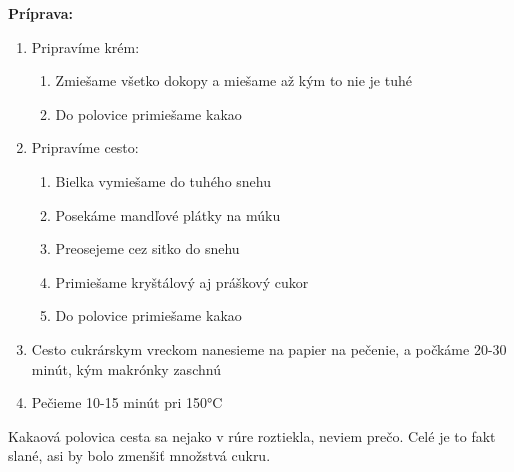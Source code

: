 \begin{recipe}
\textbf{ {\normalsize Príprava:} }
\begin{enumerate}

  \item{Pripravíme krém: }
      \begin{enumerate}
          \item{Zmiešame všetko dokopy a miešame až kým to nie je tuhé}
          \item{Do polovice primiešame kakao}\end{enumerate}
  \item{Pripravíme cesto: }
      \begin{enumerate}
          \item{Bielka vymiešame do tuhého snehu}
          \item{Posekáme mandľové plátky na múku}
          \item{Preosejeme cez sitko do snehu}
          \item{Primiešame kryštálový aj práškový cukor}
          \item{Do polovice primiešame kakao}\end{enumerate}
  \item{Cesto cukrárskym vreckom nanesieme na papier na pečenie, a počkáme 20-30 minút, kým makrónky zaschnú}
  \item{Pečieme 10-15 minút pri 150°C}

\end{enumerate}
\end{recipe}

\begin{notes}
  Kakaová polovica cesta sa nejako v rúre roztiekla, neviem prečo. Celé je to fakt slané, asi by bolo zmenšiť množstvá cukru.
\end{notes}	
\clearpage
